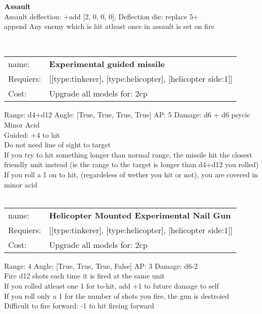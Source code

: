 {\bf Assault} \ \\
Assault deflection: +add [2, 0, 0, 0], Deflection die: replace 5+
\\ 

append Any enemy which is hit atleast once in assault is set on fire


\ \\
\begin{tabular}{ll}
name: & {\bf Experimental guided missile } \\
Requiers: & [[type:tinkerer], [type:helicopter], [helicopter side:1]] \\
Cost: & Upgrade all models for: 2cp \\
\end{tabular}



Range: d4+d12  Angle: [True, True, True, True] AP: 5 Damage: d6 + d6 psycic \\
Minor Acid\\ 
Guided: +4 to hit\\ 
Do not need line of sight to target\\ 
If you try to hit something longer than normal range, the missile hit the closest friendly unit instead (ie the range to the target is longer than d4+d12 you rolled)\\ 
If you roll a 1 on to hit, (regardeless of wether you hit or not), you are covered in minor acid\\ 








\ \\
\begin{tabular}{ll}
name: & {\bf Helicopter Mounted Experimental Nail Gun } \\
Requiers: & [[type:tinkerer], [type:helicopter], [helicopter side:1]] \\
Cost: & Upgrade all models for: 2cp \\
\end{tabular}



Range: 4  Angle: [True, True, True, False] AP: 3 Damage: d6-2 \\
Fire d12 shots each time it is fired at the same unit\\ 
If you rolled atleast one 1 for to-hit, add +1 to future damage to self\\ 
If you roll only a 1 for the number of shots you fire, the gun is destroied\\ 
Difficult to fire forward: -1 to hit fireing forward\\ 








